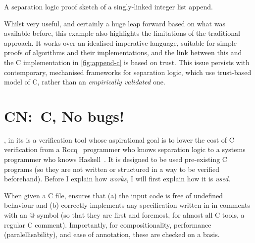 \begin{marginfigure}
    \inputminted[breaklines,mathescape,fontsize=\small]{py}{code/append_annot.py}
    \caption{A separation logic proof sketch of a singly-linked integer list
        append.}\label{fig:append-annot}
\end{marginfigure}

Whilst very useful, and certainly a huge leap forward based on what was
available before, this example also highlights the limitations of the
traditional approach. It works over an idealised imperative language, suitable
for simple proofs of algorithms and their implementations, and the link between
this and the C implementation in \cref{fig:append-c} is based on trust. This
issue persists with contemporary, mechanised frameworks for separation
logic,
which use trust-based model of C, rather than an \emph{empirically validated}
one.

\section{CN:\ C, No bugs!}\label{sec:cn-intro}

, in its  is a verification tool whose aspirational goal is to lower the cost of
C verification from a Rocq~ programmer who knows separation
logic to a systems programmer who knows Haskell~. It is designed to be used pre-existing C
programs (so they are not written or structured in a way to be verified
beforehand). Before I explain how \emph{works}, I will first explain how it is
\emph{used}.

When given a C file,  ensures that (a) the input code is free of
undefined behaviour and (b) correctly implements any specification written in
 in comments with an @ symbol 
(so that they are first and foremost, for almost all C tools, a regular C
comment). Importantly, for compositionality, performance (paralellisability),
and ease of annotation, these are checked on a  basis.

